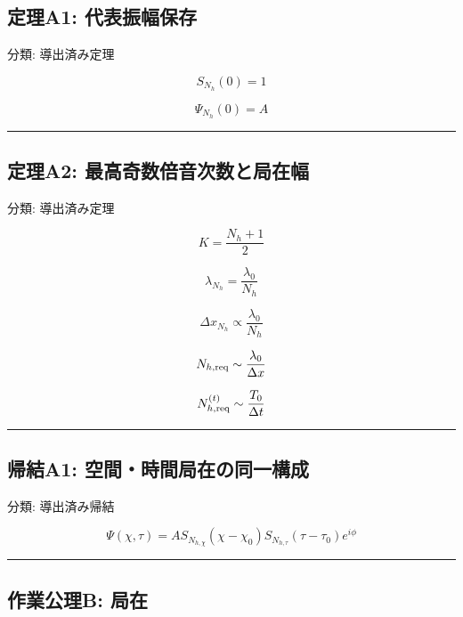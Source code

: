\documentclass[
  a4paper,
]{ltjsarticle}
\begin{document}
\subsection{定理A1:
代表振幅保存}\label{ux5b9aux7406a1-ux4ee3ux8868ux632fux5e45ux4fddux5b58}

分類: 導出済み定理

\[
S_{N_h}(0)=1
\]

\[
\Psi_{N_h}(0)=A
\]

\begin{center}\rule{0.5\linewidth}{0.5pt}\end{center}

\subsection{定理A2:
最高奇数倍音次数と局在幅}\label{ux5b9aux7406a2-ux6700ux9ad8ux5947ux6570ux500dux97f3ux6b21ux6570ux3068ux5c40ux5728ux5e45}

分類: 導出済み定理

\[
K=\frac{N_h+1}{2}
\]

\[
\lambda_{N_h}=\frac{\lambda_0}{N_h}
\]

\[
\Delta x_{N_h}\propto\frac{\lambda_0}{N_h}
\]

\[
N_{h,\rm req}\sim\frac{\lambda_0}{\Delta x}
\]

\[
N_{h,\rm req}^{(t)}\sim\frac{T_0}{\Delta t}
\]

\begin{center}\rule{0.5\linewidth}{0.5pt}\end{center}

\subsection{帰結A1:
空間・時間局在の同一構成}\label{ux5e30ux7d50a1-ux7a7aux9593ux6642ux9593ux5c40ux5728ux306eux540cux4e00ux69cbux6210}

分類: 導出済み帰結

\[
\Psi(\chi,\tau)=A S_{N_{h,\chi}}(\chi-\chi_0)S_{N_{h,\tau}}(\tau-\tau_0)e^{i\phi}
\]

\begin{center}\rule{0.5\linewidth}{0.5pt}\end{center}

\subsection{作業公理B:
局在}\label{ux4f5cux696dux516cux7406b-ux5c40ux5728}
\end{document}
